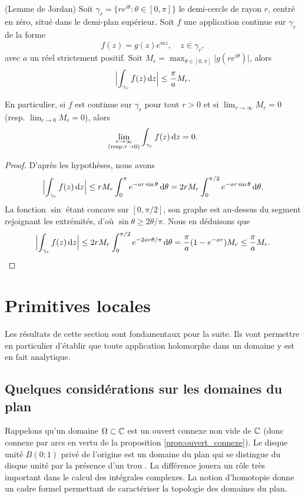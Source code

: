 %
\begin{fprop}(Lemme de Jordan)\label{prop:jordan}
Soit $\gamma_r =\{r e^{i \theta} : \theta \in [0,\pi]\}$ le demi-cercle de rayon $r$, centré en zéro, situé dans le demi-plan supérieur. Soit $f$ une application continue sur $\gamma_r$ de la forme 
\[f(z)=g(z) e^{i a z}, \quad z \in \gamma_r,\]
avec $a$ un réel strictement positif. Soit $M_r=\max_{\theta \in [0, \pi]} \lvert g\left(re^{i\theta}\right)\rvert$, alors
\[\Bigl \lvert\int_{\gamma_r} f(z) \mathop{}\mathopen{}\mathrm{d} z \Bigr \rvert \leq \frac{\pi}{a}M_r.\] 
\end{fprop}
\begin{rem}
En particulier, si $f$ est continue sur $\gamma_r$ pour tout $r>0$ et si $\lim_{r \to \infty} M_r=0$ (resp. $\lim_{r \to 0} M_r=0$), alors
\[\lim_{\substack{r \to \infty \\(\text{resp.} r \to  0)}} \int_{\gamma_r} f(z)\mathop{}\mathopen{}\mathrm{d} z =0.\]
\end{rem}
\begin{proof}
D'après les hypothèses, nous avons 
\[\Bigl \lvert\int_{\gamma_r} f(z) \mathop{}\mathopen{}\mathrm{d} z \Bigr \rvert \leq r M_r \int_0^\pi e^{- a r \sin \theta} \mathop{}\mathopen{}\mathrm{d} \theta = 2 r M_r \int_0^{\pi/2} e^{- a r \sin \theta} \mathop{}\mathopen{}\mathrm{d} \theta.\]
La fonction $\sin$ étant concave sur $[0,\pi/2]$, son graphe est au-dessus du segment rejoignant les extrémités, d'où $\sin \theta \geq 2 \theta/\pi$. Nous en déduisons que 
\[ \Bigl \lvert\int_{\gamma_r} f(z) \mathop{}\mathopen{}\mathrm{d} z \Bigr \rvert \leq 2 r M_r \int_0^{\pi/2} e^{-2 a r \theta/\pi} \mathop{}\mathopen{}\mathrm{d} \theta
=\frac{\pi}{a} (1-e^{-a r}) M_r \leq \frac{\pi}{a}M_r.\]
\end{proof}

\section{Primitives locales}

Les résultats de cette section sont fondamentaux pour la suite. Ils vont
permettre en particulier d'établir que toute application holomorphe dans un
domaine y est en fait analytique.

\subsection{Quelques considérations sur les domaines du plan}
Rappelons qu'un domaine $\Omega \subset \mathbb{C}$ est un ouvert connexe non vide de $\mathbb{C}$ (donc connexe par arcs en vertu de la proposition \ref{prop:ouvert_connexe}).  Le disque unité $B(0 ;1)$ privé de l'origine est un domaine du plan qui se distingue du disque unité par la présence d'un \og trou \fg{}. La différence jouera un rôle très important dans le calcul des intégrales complexes. La notion d'homotopie donne un cadre formel permettant de caractériser la topologie des domaines du plan.

